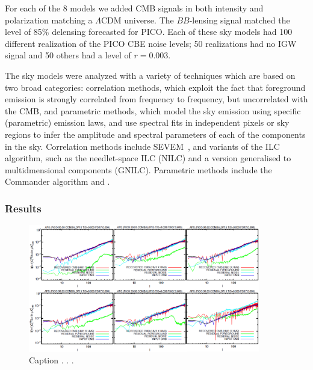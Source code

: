 \documentclass[PICOReport.tex]{subfiles}
\begin{document}
For each of the 8 models we added CMB signals in both intensity and polarization matching a $\Lambda$CDM universe. The $BB$-lensing signal matched the level of 85\% delensing forecasted for PICO. Each of these sky models had 100 different realization of the PICO CBE noise levels; 50 realizations had no \ac{IGW} signal and 50 others had a level of $r=0.003$. 

\vspace{0.1in}
 \hspace{0.1in} The sky models were analyzed with a variety of techniques which are based on two broad categories: correlation methods, which exploit the fact that foreground emission is strongly correlated from frequency to frequency, but uncorrelated with the CMB, and parametric methods, which model the sky emission using specific (parametric) emission laws, and use spectral fits in independent pixels or sky regions to infer the amplitude and spectral parameters of each of the components in the sky. Correlation methods include SEVEM~\citep{sevem}, and variants of the \ac{ILC} algorithm, such as the needlet-space \ac{ILC} (NILC) and a version generalised to multidmensional components (GNILC). Parametric methods include the Commander algorithm and .

\subsubsection{Results}

\begin{figure}
\begin{center}
\includegraphics[width=0.9\textwidth]{images/soumen_NILC_foregrounds.png}
\vspace{-0.1in}
\caption{Caption . . . }
\label{fig:nilc}
\end{center}
\end{figure}
\end{document}
